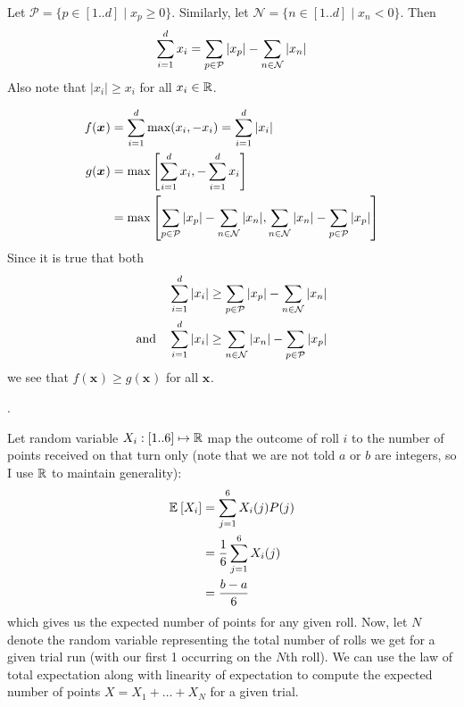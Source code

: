 \documentclass[11pt]{article}
\renewcommand\vec[2][]{\bm{#2}_{#1}}
\newcommand\myspace[1][]{\vspace{#1\bigskipamount}}
\newcommand\p{\Needspace{10\baselineskip} \noindent}
\begin{document}
Let $\mathcal P = \{ p \in [1..d] \mid x_p \ge 0  \}$. Similarly, let $\mathcal N = \{ n \in [1..d] \mid x_n < 0  \}$. Then
\begin{align}
	\sum_{i=1}^{d} x_i = \sum_{p \in \mathcal P} |x_p| - \sum_{n \in \mathcal N} |x_n|
\end{align}
Also note that $|x_i| \ge x_i$ for all $x_i \in \mathbb{R}$. 

\begin{align}
	f(\vec x)
		&= \idsum \max(x_i, -x_i) = \idsum |x_i| \\
	g(\vec x)
		&= \max\left[
			\idsum x_i, 
			- \idsum x_i
		\right] \\
		&= \max\left[
		\sum_{p \in \mathcal P} |x_p| - \sum_{n \in \mathcal N} |x_n|, 
		\sum_{n \in \mathcal N} |x_n| - \sum_{p \in \mathcal P} |x_p|
		\right]
\end{align}
Since it is true that both
\begin{align}
	\sum_{i=1}^{d} |x_i| &\ge \sum_{p \in \mathcal P} |x_p| - \sum_{n \in \mathcal N} |x_n|\\
	\text{and}\quad \sum_{i=1}^{d} |x_i| &\ge \sum_{n \in \mathcal N} |x_n| - \sum_{p \in \mathcal P} |x_p|
\end{align}
we see that $f(\vec x) \ge g(\vec x)$ for all $\vec x$. 




\myspace
\p {}. 

Let random variable $X_i : [1..6] \mapsto \mathbb{R}$ map the outcome of roll $i$ to the number of points received on that turn only (note that we are not told $a$ or $b$ are integers, so I use $\mathbb{R}$ to maintain generality):
\begin{align}
	\mathbb{E}_{}\left[X_i\right]
		&= \sum_{j=1}^6 X_i(j) P(j)  \\
		&= \frac{1}{6} \sum_{j=1}^6 X_i(j) \\
		&=  \frac{b - a}{6} 
\end{align}
which gives us the expected number of points for any given roll. Now, let $N$ denote the random variable representing the total number of rolls we get for a given trial run (with our first 1 occurring on the $N$th roll). We can use the law of total expectation along with linearity of expectation to compute the expected number of points $X = X_1 + \ldots + X_N$ for a given trial.
\end{document}

